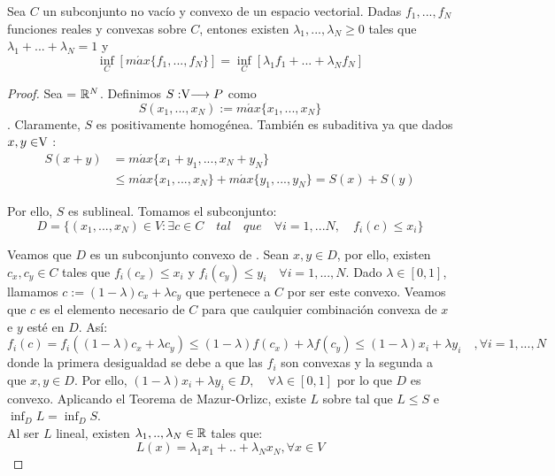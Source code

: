 	\begin{lemaBox}
		Sea $ C $ un subconjunto no vacío y convexo de un espacio vectorial. Dadas $ f_1, ..., f_N $ funciones reales y convexas sobre $ C $, entones existen $ \lambda_1, ..., \lambda_N \geq 0$ tales que $ \lambda_1+ ...+ \lambda_N = 1$ y
		\[
		\inf_C\left[ m\acute{a}x \{f_1, ..., f_N\}\right] = \inf_C \left[ \lambda_1 f_1+ ...+\lambda_N f_N \right]
		\] 
	\end{lemaBox}
	\begin{proof}
		Sea  \vecSpace = $ \mathbb{R}^N $. Definimos $S:\vecSpace \longrightarrow P $ como \[ S(x_1, ..., x_N) := m\acute{a}x \{x_1, ..., x_N\} \]. Claramente, $ S $ es positivamente homogénea. También es subaditiva ya que dados $ x,y \in \vecSpace $ : 
		\begin{equation*}
		\begin{split}
		S(x+y) &= m\acute{a}x \{x_1 + y_1, ..., x_N +y_N \}\\ 
		&\leq m\acute{a}x \{x_1, ..., x_N\} + m\acute{a}x \{y_1, ...,y_N\} = S(x) + S(y)
		\end{split}
		\end{equation*}
		
		Por ello, $ S $ es sublineal. Tomamos el subconjunto:
		\[ 
		D = \{ (x_1, ..., x_N)\in V: \exists c \in C \quad tal \quad que \quad \forall i = 1,...N,\quad f_i(c) \leq x_i \}
		\]
		
		Veamos que $ D $ es un subconjunto convexo de \vecSpace. Sean $ x, y \in D $, por ello, existen $ c_x, c_y \in C $ tales que $ f_i (c_x) \leq x_i  $ y $ f_i (c_y) \leq y_i \quad \forall i=1,...,N $. Dado $ \lambda \in [0,1] $, llamamos $ c := (1-\lambda)c_x + \lambda c_y $ que pertenece a $ C $ por ser este convexo. Veamos que $ c $ es el elemento necesario de $ C $ para que caulquier combinación convexa de $ x $ e $ y $ esté en $ D $. Así:	
		\[
		f_i(c) = f_i((1-\lambda)c_x + \lambda c_y) \leq (1-\lambda)f(c_x) + \lambda f(c_y) \leq (1-\lambda)x_i + \lambda y_i \quad , \forall i =1,...,N 
		\]
		donde la primera desigualdad se debe a que las $ f_i $ son convexas y la segunda a que $ x,y \in D $. Por ello, $ (1-\lambda)x_i + \lambda y_i \in D , \quad \forall \lambda \in [0,1] $ por lo que $ D $ es convexo. Aplicando el Teorema de Mazur-Orlizc, existe $ L $ sobre \vecSpace tal que $ L \leq S $ e $ \inf_D L = \inf_D S $. \\
		
		Al ser $ L $ lineal, existen $ \lambda_1, .., \lambda_N \in \mathbb{R}$ tales que: 
		\[
		L(x) =  \lambda_1 x_1 + ..+ \lambda_N x_N , \forall x \in V \] 
		

\end{proof}
